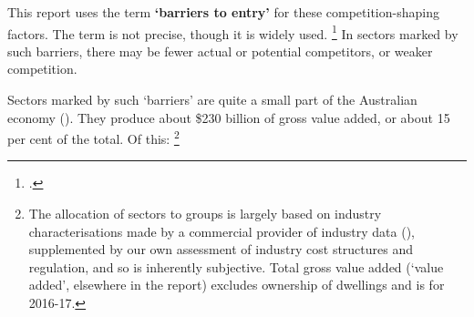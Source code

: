 This report uses the term \textbf{`barriers to entry'} for these competition-shaping factors. The term is not precise, though it is widely used.%
\footcites{DemsetzBarriersAER1982}{CarltonBarriers2005}{OECDBarriers2007}
In sectors marked by such barriers, there may be fewer actual or potential competitors, or weaker competition.


Sectors marked by such `barriers' are quite a small part of the Australian economy (). They produce about \$230 billion of gross value added, or about 15 per cent of the total. Of this:%
    \footnote{The allocation of sectors to groups is largely based on industry characterisations made by a commercial provider of industry data (\textcites{IBISWorldIndustry2017}{IBISWorldCompany2017}), supplemented by our own assessment of industry cost structures and regulation, and so is inherently subjective. Total gross value added (`value added', elsewhere in the report) excludes ownership of dwellings and is for  2016-17.}

